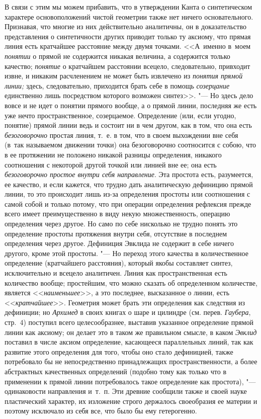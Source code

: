 В связи с этим мы можем прибавить, что в утверждении Канта о синтетическом
характере основоположений чистой геометрии также нет ничего основательного.
Признавая, что многие из них действительно аналитичны, он в доказательство
представления о синтетичности других приводит только ту аксиому, что прямая
линия есть кратчайшее расстояние между двумя точками. <<А~именно в~моем
{\em понятии} о прямой не содержится никакая величина, а содержится только
качество; {\em понятие} о кратчайшем расстоянии всецело, следовательно,
привходит извне, и никаким расчленением не может быть извлечено из
{\em понятия прямой линии;} здесь, следовательно, приходится брать себе в
помощь {\em созерцание} единственно лишь посредством которого возможен
синтез>>. "--- Но здесь дело вовсе и не идет о понятии прямого вообще, а о
прямой линии, последняя же есть уже нечто пространственное, созерцаемое.
Определение (или, если угодно, понятие) прямой линии ведь и состоит ни в чем
другом, как в том, что она есть {\em безоговорочно} простая линия, т.~е. в том,
что в своем выхождении вне себя (в~так называемом движении точки) она
безоговорочно соотносится с собою, что в ее протяжении не положено никакой
разницы определения, никакого соотношения с некоторой другой точкой или линией
вне ее; она есть {\em безоговорочно простое внутри себя направление}. Эта
простота есть, разумеется, ее качество, и если кажется, что трудно дать
аналитическую дефиницию прямой линии, то это происходит лишь из-за определения
простоты или соотношения с самой собой и только потому, что при операции
определения рефлексия прежде всего имеет преимущественно в виду некую
множественность, операцию определения через другое. Но само по себе нисколько
не трудно понять это определение простоты протяжения внутри себя, отсутствие в
последнем определения через другое. Дефиниция Эвклида не содержит в себе ничего
другого, кроме этой простоты. "--- Но переход этого качества в количественное
определение (кратчайшего расстояния), который якобы составляет синтез,
исключительно и всецело аналитичен. Линия как пространственная есть количество
вообще; простейшим, что можно сказать об определенном количестве, является
<<{\em наименьшее}>>, а это последнее, высказанное о линии, есть
<<{\em кратчайшее}>>. Геометрия может брать эти определения как следствия из
дефиниции; но {\em Архимед} в своих книгах о шаре и цилиндре (см. перев.
{\em Гаубера}, стр.~4) поступил всего целесообразнее, выставив указанное
определение прямой линии как аксиому; он делает это в таком же правильном
смысле, в каком {\em Эвклид} поставил в числе аксиом определение, касающееся
параллельных линий, так как развитие этого определения для того, чтобы оно
стало дефиницией, также потребовало бы не непосредственно принадлежащих
пространственности, а более абстрактных качественных определений (подобно тому
как только что в применении к прямой линии потребовалось такое определение как
простота), "--- одинаковости направления и~т.~п. Эти древние сообщили также и
своей науке пластический характер, их изложение строго держалось своеобразия ее
материи и поэтому исключало из себя все, что было бы ему гетерогенно.

